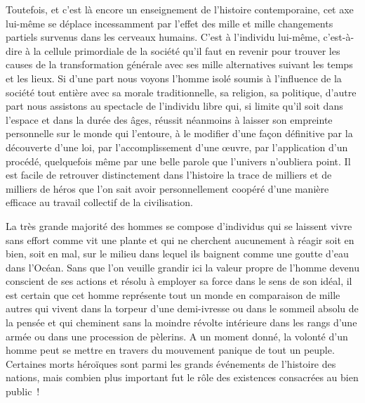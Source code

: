 \documentclass[french,twoside]{book} %
\begin{document}
 Toutefois, et c’est là encore un enseignement de l’histoire contemporaine, cet axe lui-même se déplace incessamment par l’effet des mille et mille changements partiels survenus dans les cerveaux humains. C’est à l’individu lui-même, c’est-à-dire à la cellule primordiale de la société qu’il faut en revenir pour trouver les causes de la transformation générale avec ses mille alternatives suivant les temps et les lieux. Si d’une part nous voyons l’homme isolé soumis à l’influence de la société tout entière avec sa morale traditionnelle, sa religion, sa politique, d’autre part nous assistons au spectacle de l’individu libre qui, si limite qu’il soit dans l’espace et dans la durée des âges, réussit néanmoins à laisser son  empreinte personnelle sur le monde qui l’entoure, à le modifier d’une façon définitive par la découverte d’une loi, par l’accomplissement d’une œuvre, par l’application d’un procédé, quelquefois même par une belle parole que l’univers n’oubliera point. Il est facile de retrouver distinctement dans l’histoire la trace de milliers et de milliers de héros que l’on sait avoir personnellement coopéré d’une manière efficace au travail collectif de la civilisation.\par
La très grande majorité des hommes se compose d’individus qui se laissent vivre sans effort comme vit une plante et qui ne cherchent aucunement à réagir soit en bien, soit en mal, sur le milieu dans lequel ils baignent comme une goutte d’eau dans l’Océan. Sans que l’on  veuille grandir ici la valeur propre de l’homme devenu conscient de ses actions et résolu à employer sa force dans le sens de son idéal, il est certain que cet homme représente tout un monde en comparaison de mille autres qui vivent dans la torpeur d’une demi-ivresse ou dans le sommeil absolu de la pensée et qui cheminent sans la moindre révolte intérieure dans les rangs d’une armée ou dans une procession de pèlerins. A un moment donné, la volonté d’un homme peut se mettre en travers du mouvement panique de tout un peuple. Certaines morts héroïques sont parmi les grands événements de l’histoire des nations, mais combien plus important fut le rôle des existences consacrées au bien public !\par
\end{document}
